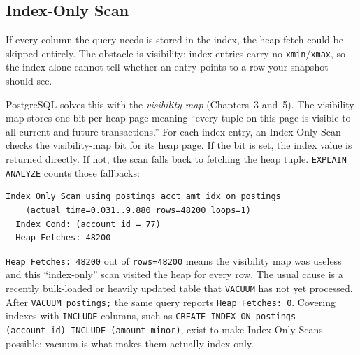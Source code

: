 \subsection{Index-Only Scan}

If every column the query needs is stored in the index, the heap fetch could be skipped entirely. The obstacle is visibility: index entries carry no \texttt{xmin}/\texttt{xmax}, so the index alone cannot tell whether an entry points to a row your snapshot should see.

PostgreSQL solves this with the \emph{visibility map} (Chapters~3 and~5). The visibility map stores one bit per heap page meaning ``every tuple on this page is visible to all current and future transactions.'' For each index entry, an Index-Only Scan checks the visibility-map bit for its heap page. If the bit is set, the index value is returned directly. If not, the scan falls back to fetching the heap tuple. \texttt{EXPLAIN ANALYZE} counts those fallbacks:

\begin{lstlisting}[language=Plain]
Index Only Scan using postings_acct_amt_idx on postings
    (actual time=0.031..9.880 rows=48200 loops=1)
  Index Cond: (account_id = 77)
  Heap Fetches: 48200
\end{lstlisting}

\texttt{Heap Fetches: 48200} out of \texttt{rows=48200} means the visibility map was useless and this ``index-only'' scan visited the heap for every row. The usual cause is a recently bulk-loaded or heavily updated table that \texttt{VACUUM} has not yet processed. After \texttt{VACUUM postings;} the same query reports \texttt{Heap Fetches: 0}. Covering indexes with \texttt{INCLUDE} columns, such as \texttt{CREATE INDEX ON postings (account\_id) INCLUDE (amount\_minor)}, exist to make Index-Only Scans possible; vacuum is what makes them actually index-only.

